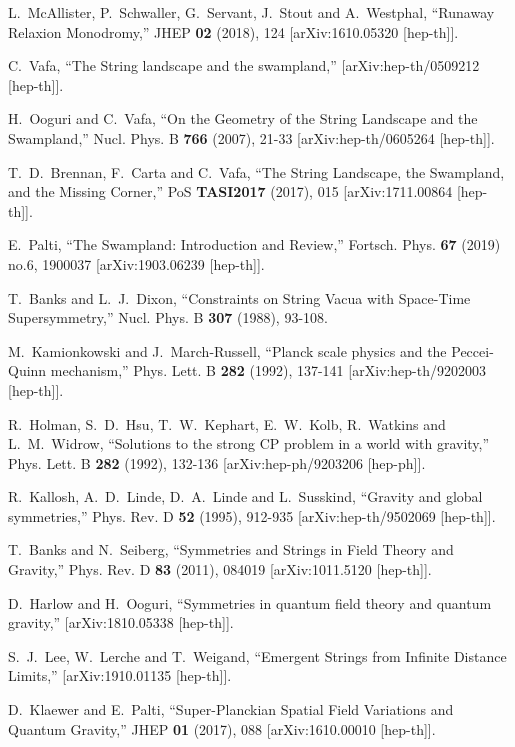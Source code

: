 \documentclass[12pt]{article}
\numberwithin{equation}{section}
\begin{document}
\begin{thebibliography}{999}
L.~McAllister, P.~Schwaller, G.~Servant, J.~Stout and A.~Westphal,
``Runaway Relaxion Monodromy,''
JHEP \textbf{02} (2018), 124
[arXiv:1610.05320 [hep-th]].

C.~Vafa, ``The String landscape and the swampland,''
[arXiv:hep-th/0509212 [hep-th]].

H.~Ooguri and C.~Vafa,
``On the Geometry of the String Landscape and the Swampland,''
Nucl. Phys. B \textbf{766} (2007), 21-33
[arXiv:hep-th/0605264 [hep-th]].

T.~D.~Brennan, F.~Carta and C.~Vafa,
``The String Landscape, the Swampland, and the Missing Corner,''
PoS \textbf{TASI2017} (2017), 015
[arXiv:1711.00864 [hep-th]].

E.~Palti, ``The Swampland: Introduction and Review,''
Fortsch. Phys. \textbf{67} (2019) no.6, 1900037
[arXiv:1903.06239 [hep-th]].

T.~Banks and L.~J.~Dixon,
``Constraints on String Vacua with Space-Time Supersymmetry,'' Nucl. Phys. B \textbf{307} (1988), 93-108.

M.~Kamionkowski and J.~March-Russell,
``Planck scale physics and the Peccei-Quinn mechanism,''
Phys. Lett. B \textbf{282} (1992), 137-141
[arXiv:hep-th/9202003 [hep-th]].

R.~Holman, S.~D.~Hsu, T.~W.~Kephart, E.~W.~Kolb, R.~Watkins and L.~M.~Widrow,
``Solutions to the strong CP problem in a world with gravity,''
Phys. Lett. B \textbf{282} (1992), 132-136
[arXiv:hep-ph/9203206 [hep-ph]].

R.~Kallosh, A.~D.~Linde, D.~A.~Linde and L.~Susskind,
``Gravity and global symmetries,''
Phys. Rev. D \textbf{52} (1995), 912-935
[arXiv:hep-th/9502069 [hep-th]].

T.~Banks and N.~Seiberg,
``Symmetries and Strings in Field Theory and Gravity,''
Phys. Rev. D \textbf{83} (2011), 084019
[arXiv:1011.5120 [hep-th]].

D.~Harlow and H.~Ooguri,
``Symmetries in quantum field theory and quantum gravity,'' [arXiv:1810.05338 [hep-th]].

S.~J.~Lee, W.~Lerche and T.~Weigand,
``Emergent Strings from Infinite Distance Limits,''
[arXiv:1910.01135 [hep-th]].

D.~Klaewer and E.~Palti,
``Super-Planckian Spatial Field Variations and Quantum Gravity,''
JHEP \textbf{01} (2017), 088
[arXiv:1610.00010 [hep-th]].


\end{thebibliography}
\end{document}

